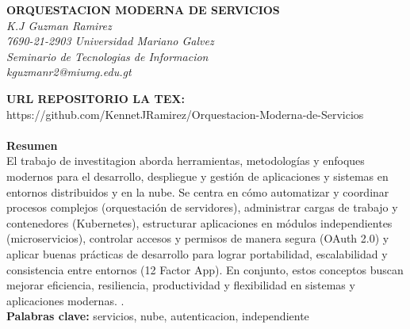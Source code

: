 \documentclass[12pt]{article}
\begin{document}
\begin{center}
    {\bfseries\uppercase{orquestacion moderna de servicios}} \\
    {\itshape K.J Guzman Ramirez}\\
    {\itshape 7690-21-2903 Universidad Mariano Galvez} \\
    {\itshape Seminario de Tecnologias de Informacion} \\
    {\itshape kguzmanr2@miumg.edu.gt} \\
\end{center}

\textbf{URL REPOSITORIO LA TEX: } \\
https://github.com/KennetJRamirez/Orquestacion-Moderna-de-Servicios
\\\\
\vspace{1em}
\noindent\textbf{Resumen}\\
El trabajo de investitagion aborda herramientas, metodologías y enfoques modernos para el desarrollo, despliegue y gestión de aplicaciones y sistemas en entornos distribuidos y en la nube. Se centra en cómo automatizar y coordinar procesos complejos (orquestación de servidores), administrar cargas de trabajo y contenedores (Kubernetes), estructurar aplicaciones en módulos independientes (microservicios), controlar accesos y permisos de manera segura (OAuth 2.0) y aplicar buenas prácticas de desarrollo para lograr portabilidad, escalabilidad y consistencia entre entornos (12 Factor App). En conjunto, estos conceptos buscan mejorar eficiencia, resiliencia, productividad y flexibilidad en sistemas y aplicaciones modernas.
. \\

\noindent\textbf{Palabras clave: } servicios, nube, autenticacion, independiente
\end{document}
